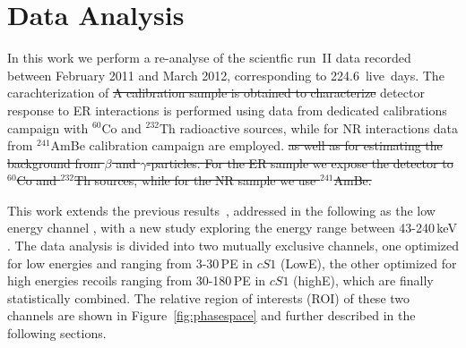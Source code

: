 \section{Data Analysis}
\label{sec:Analysis}
In this work we perform a re-analyse of the scientfic run~II data recorded between February 2011 and March 2012, 
corresponding to 224.6~live~days. The carachterization of \sout{A calibration sample is obtained to characterize} detector response to ER interactions
is performed using data from dedicated calibrations campaign with $^{60}$Co and $^{232}$Th radioactive sources, while for NR interactions data from $^{241}$AmBe calibration campaign are employed.
\sout{as well as for estimating the background from $\beta$ and $\gamma$-particles. For the ER sample we expose the detector to $^{60}$Co and $^{232}$Th sources, while for the NR sample we use $^{241}$AmBe.}


This work extends the previous results~\cite{xe100_run10_si,xe100_run_combination}, addressed in the following as the low energy channel , with a new study exploring the energy range between 43-240\,keV . 
The data analysis is divided into two mutually exclusive channels, one optimized for low energies and ranging from 3-30\,PE in $cS1$ (LowE), the other optimized for high energies recoils
ranging from 30-180\,PE in $cS1$ (highE), which are finally statistically combined. 
The relative region of interests (ROI) of these two channels are shown in Figure~\ref{fig:phasespace} and further described in the following sections. 





